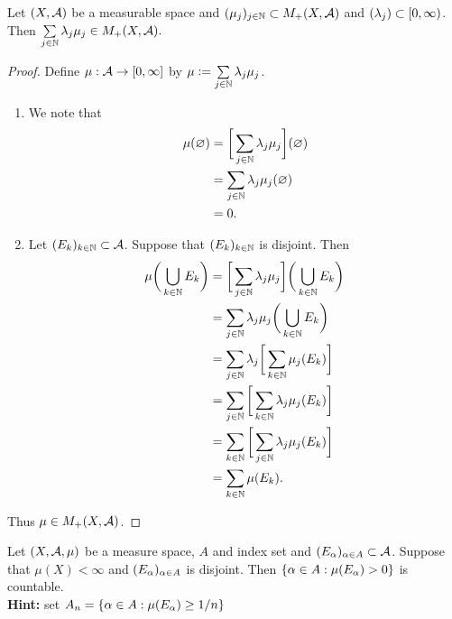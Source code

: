 \documentclass{book}
\begin{document}
	\begin{ex} 
		Let $(X,\mathcal{A})$ be a measurable space and $(\mu_j)_{j \in \mathbb{N}} \subset M_+(X, \mathcal{A})$ and $(\lambda_j) \subset [0,\infty)$. Then $\sum\limits_{j \in \mathbb{N}} \lambda_j \mu_j \in M_+(X, \mathcal{A}).$ 
	\end{ex}

	\begin{proof} Define $\mu: \mathcal{A} \rightarrow [0,\infty]$ by $\mu \vcentcolon= \sum\limits_{j \in \mathbb{N}} \lambda_j \mu_j$.
		\begin{enumerate}
			\item We note that
			\begin{align*}
				\mu(\varnothing)
				& = \bigg[ \sum\limits_{j \in \mathbb{N}} \lambda_j \mu_j\bigg](\varnothing) \\
				& = \sum\limits_{j \in \mathbb{N}} \lambda_j \mu_j(\varnothing) \\
				& = 0.
			\end{align*}
			\item Let $(E_k)_{k \in \mathbb{N}} \subset \mathcal{A}$. Suppose that $(E_k)_{k \in \mathbb{N}}$ is disjoint. Then 
			\begin{align*}
				\mu \bigg( \bigcup_{k \in \mathbb{N}} E_k \bigg)
				& = \bigg[ \sum\limits_{j \in \mathbb{N}} \lambda_j \mu_j\bigg]\bigg( \bigcup_{k \in \mathbb{N}} E_k \bigg) \\
				& = \sum\limits_{j \in \mathbb{N}} \lambda_j \mu_j \bigg( \bigcup_{k \in \mathbb{N}} E_k \bigg) \\
				& = \sum\limits_{j \in \mathbb{N}} \lambda_j \bigg[ \sum\limits_{k \in \mathbb{N}} \mu_j(E_k) \bigg] \\
				& = \sum\limits_{j \in \mathbb{N}} \bigg[ \sum\limits_{k \in \mathbb{N}} \lambda_j \mu_j(E_k) \bigg] \\
				& = \sum\limits_{k \in \mathbb{N}} \bigg[ \sum\limits_{j \in \mathbb{N}} \lambda_j \mu_j(E_k) \bigg] \\
				& = \sum\limits_{k \in \mathbb{N}} \mu(E_k).
			\end{align*}
		\end{enumerate}
	Thus $\mu \in M_+(X, \mathcal{A})$.
	\end{proof}
	
	\begin{ex} 
	Let $(X, \mathcal{A}, \mu)$ be a measure space, $A$ and index set and $(E_{\alpha})_{\alpha \in A} \subset \mathcal{A}$. Suppose that $\mu(X) < \infty$ and $(E_\alpha)_{\alpha \in A }$ is disjoint. Then $\{\alpha \in A: \mu(E_{\alpha}) >0\}$ is countable.\\
	\textbf{Hint:} set $A_n = \{\alpha \in A: \mu(E_{\alpha}) \geq 1/n \}$ 
	\end{ex}
	
\end{document}
